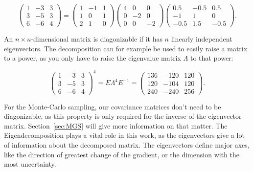 \begin{equation}
  \begin{pmatrix}
    1 & {-3} & 3\\
    3 & {-5} & 3\\
    6 & {-6} & 4
  \end{pmatrix}
  =
  \begin{pmatrix}
    1 & {-1} & 1\\
    1 & 0 & 1\\
    2 & 1 & 0
  \end{pmatrix}
  \begin{pmatrix}
    4 & 0 & 0\\
    0 & {-2} & 0\\
    0 & 0 & {-2}
  \end{pmatrix}
  \begin{pmatrix}
    0.5 & {-0.5} & 0.5\\
    {-1} & 1 & 0\\
    {-0.5} & 1.5 & {-0.5}
  \end{pmatrix}
  .
\end{equation}

\noindent An $n \times n$-dimensional matrix is diagonizable if it has
$n$ linearly independent eigenvectors. The decomposition can for example
be used to easily raise a matrix to a power, as you only have to raise
the eigenvalue matrix $\Lambda$ to that power:

\begin{equation}
  \begin{pmatrix}
    1 & {-3} & 3\\
    3 & {-5} & 3\\
    6 & {-6} & 4
  \end{pmatrix}
  ^4
  =
  E
  \Lambda^4
  E^{-1}
  =
  \begin{pmatrix}
    136 & {-120} & 120\\
    120 & {-104} & 120\\
    240 & {-240} & 256
  \end{pmatrix}
  .
\end{equation}

\noindent For the Monte-Carlo sampling, our covariance matrices don't need
to be diagonizable, as this property is only required for the inverse of
the eigenvector matrix. Section~\ref{sec:MGS} will give more information
on that matter. The Eigendecomposition plays a vital role in this work,
as the eigenvectors give a lot of information about the decomposed matrix.
The eigenvectors define major axes, like the direction of greatest change
of the gradient, or the dimension with the most uncertainty.

